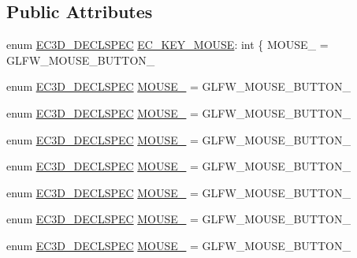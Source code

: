 \subsection*{Public Attributes}
\begin{DoxyCompactItemize}
\item 
enum \mbox{\hyperlink{_common_8h_aac42573e202ca3dd4d259c81691e2369}{E\+C3\+D\+\_\+\+D\+E\+C\+L\+S\+P\+EC}} \mbox{\hyperlink{classec_1_1_mouse_acabdd3509adc381e415c60b29554e2fb}{E\+C\+\_\+\+K\+E\+Y\+\_\+\+M\+O\+U\+SE}}\+: int \{ M\+O\+U\+S\+E\+\_ = G\+L\+F\+W\+\_\+\+M\+O\+U\+S\+E\+\_\+\+B\+U\+T\+T\+O\+N\+\_
\item 
enum \mbox{\hyperlink{_common_8h_aac42573e202ca3dd4d259c81691e2369}{E\+C3\+D\+\_\+\+D\+E\+C\+L\+S\+P\+EC}} \mbox{\hyperlink{classec_1_1_mouse_abc6758e2f7cbc1a68f7a06fe47658da0}{M\+O\+U\+S\+E\+\_}} = G\+L\+F\+W\+\_\+\+M\+O\+U\+S\+E\+\_\+\+B\+U\+T\+T\+O\+N\+\_
\item 
enum \mbox{\hyperlink{_common_8h_aac42573e202ca3dd4d259c81691e2369}{E\+C3\+D\+\_\+\+D\+E\+C\+L\+S\+P\+EC}} \mbox{\hyperlink{classec_1_1_mouse_aef8f14fad2bb8f10a8511f123fad6d57}{M\+O\+U\+S\+E\+\_}} = G\+L\+F\+W\+\_\+\+M\+O\+U\+S\+E\+\_\+\+B\+U\+T\+T\+O\+N\+\_
\item 
enum \mbox{\hyperlink{_common_8h_aac42573e202ca3dd4d259c81691e2369}{E\+C3\+D\+\_\+\+D\+E\+C\+L\+S\+P\+EC}} \mbox{\hyperlink{classec_1_1_mouse_a3294f278dbfb84d2c0583428db4fbf68}{M\+O\+U\+S\+E\+\_}} = G\+L\+F\+W\+\_\+\+M\+O\+U\+S\+E\+\_\+\+B\+U\+T\+T\+O\+N\+\_
\item 
enum \mbox{\hyperlink{_common_8h_aac42573e202ca3dd4d259c81691e2369}{E\+C3\+D\+\_\+\+D\+E\+C\+L\+S\+P\+EC}} \mbox{\hyperlink{classec_1_1_mouse_a09bfd1f313adb3d6a7a7b2b2be3f2775}{M\+O\+U\+S\+E\+\_}} = G\+L\+F\+W\+\_\+\+M\+O\+U\+S\+E\+\_\+\+B\+U\+T\+T\+O\+N\+\_
\item 
enum \mbox{\hyperlink{_common_8h_aac42573e202ca3dd4d259c81691e2369}{E\+C3\+D\+\_\+\+D\+E\+C\+L\+S\+P\+EC}} \mbox{\hyperlink{classec_1_1_mouse_ad43b84bc1128a214fd0cbbdbcbbf79f2}{M\+O\+U\+S\+E\+\_}} = G\+L\+F\+W\+\_\+\+M\+O\+U\+S\+E\+\_\+\+B\+U\+T\+T\+O\+N\+\_
\item 
enum \mbox{\hyperlink{_common_8h_aac42573e202ca3dd4d259c81691e2369}{E\+C3\+D\+\_\+\+D\+E\+C\+L\+S\+P\+EC}} \mbox{\hyperlink{classec_1_1_mouse_ab7f2eeab8dc21a68af82e877dd980cad}{M\+O\+U\+S\+E\+\_}} = G\+L\+F\+W\+\_\+\+M\+O\+U\+S\+E\+\_\+\+B\+U\+T\+T\+O\+N\+\_
\item 
enum \mbox{\hyperlink{_common_8h_aac42573e202ca3dd4d259c81691e2369}{E\+C3\+D\+\_\+\+D\+E\+C\+L\+S\+P\+EC}} \mbox{\hyperlink{classec_1_1_mouse_ad8e689eef8a2d016daf1a1ab1827a2bb}{M\+O\+U\+S\+E\+\_}} = G\+L\+F\+W\+\_\+\+M\+O\+U\+S\+E\+\_\+\+B\+U\+T\+T\+O\+N\+\_

\end{DoxyCompactItemize}
